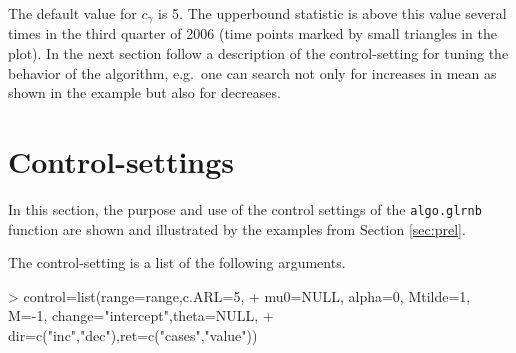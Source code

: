 \documentclass[a4paper,11pt]{article}
\begin{document}
The default value for $c_{\gamma}$ is 5. The upperbound statistic is above this value several times in the third quarter of 2006 (time points marked by small triangles in the plot). 
In the next section follow a description of the control-setting for tuning the behavior of the algorithm, e.g.\ one can search not only for increases in mean as shown in the example but also for decreases.






   
\section{Control-settings}\label{sec:control}

In this section, the purpose and use of the control settings of the \verb+algo.glrnb+ function  are shown and illustrated by the examples from Section \ref{sec:prel}.


The control-setting is a list of the following arguments.

\begin{Schunk}
\begin{Sinput}
> control=list(range=range,c.ARL=5, 
+   mu0=NULL, alpha=0, Mtilde=1, M=-1, change="intercept",theta=NULL,
+   dir=c("inc","dec"),ret=c("cases","value"))
\end{Sinput}
\end{Schunk}
\end{document}
